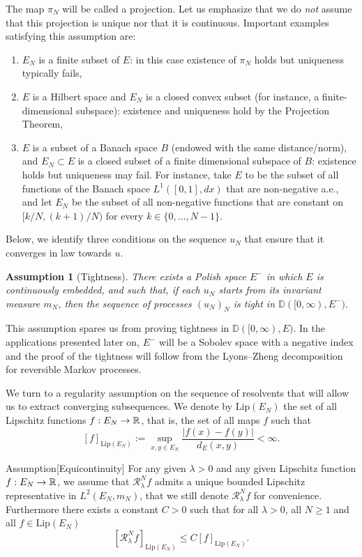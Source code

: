 \documentclass[AHL,Unicode,longabstracts]{cedram}
\theoremstyle{plain}
\newtheorem{assu}[cdrthm]{Assumption}}
\newcommand{\bbD}{\mathbb{D}}
\newcommand{\cR}{\mathcal{R}}
\newcommand{\R}{\mathbb{R}}
\newcommand*\Lip{\mathrm{Lip}}
\renewcommand*{\to}{\mathchoice{\longrightarrow}{\rightarrow}{\rightarrow}{\rightarrow}}
\begin{document}
The map $\pi_N$ will be called a projection. Let us emphasize that we do \emph{not} assume that this projection is unique nor that it is continuous. Important examples satisfying this assumption are:
\begin{enumerate}
\item\label{assuption-it1} $E_N$ is a finite subset of $E$: in this case existence of $\pi_N$ holds but uniqueness typically fails,
\item\label{assuption-it2} $E$ is a Hilbert space and $E_N$ is a closed convex subset (for instance, a finite-dimensional subspace): existence and uniqueness hold by the {Projection Theorem},
\item\label{assuption-it3} $E$ is a subset of a Banach space $B$ (endowed with the same distance/norm), and $E_N \subset E$ is a closed subset of a finite dimensional subspace of $B$: existence holds but uniqueness may fail. For instance, take $E$ to be the subset of all functions of the Banach space $L^1([0,1],dx)$ that are non-negative a.e., and let $E_N$ be the subset of all non-negative functions that are constant on $[k/N,(k+1)/N)$ for every $k\in\{0,\dots,N-1\}$.
\end{enumerate}


Below, we identify three conditions on the sequence $u_N$ that ensure that it converges in law towards $u$.

\begin{assu}[Tightness]\label{Ass:Tight}
There exists a Polish space $E^{-}$ in which $E$ is continuously embedded, and such that, if each $u_N$ starts from its invariant measure $m_N$, then the sequence of processes $(u_N)_N$ is tight in $\bbD([0,\infty),E^{-})$.
\end{assu}

This assumption spares us from proving tightness in $\bbD([0,\infty),E)$. In the applications presented later on, $E^-$ will be a Sobolev space with a negative index and the proof of the tightness will follow from the Lyons--Zheng decomposition~\cite{LyonsZheng} for reversible Markov processes.

We turn to a regularity assumption on the sequence of resolvents that will allow us to extract converging subsequences. We denote by $\Lip(E_N)$ the set of all Lipschitz functions $f:E_N\to\R$, that is, the set of all maps $f$ such that
\[
[f]_{\Lip(E_N)} := \sup_{x,y \in E_N} \frac{| f(x) - f(y) |}{d_E(x, y)}<\infty.
\]

\begin{enonce}{Assumption}[Equicontinuity]\label{Ass:Equi}
For any given $\lambda > 0$ and any given Lipschitz function $f:E_N\to\R$, we assume that $\cR_\lambda^N f$ admits a unique bounded Lipschitz representative in $L^2(E_N,m_N)$, that we still denote $\cR_\lambda^N f$ for convenience. Furthermore there exists a constant $C>0$ such that for all $\lambda > 0$, all $N\ge 1$ and all $f\in \Lip(E_N)$
\[
[\cR_\lambda^N f]_{\Lip(E_N)} \le C [f]_{\Lip(E_N)}.
\]
\end{enonce}
\end{document}
